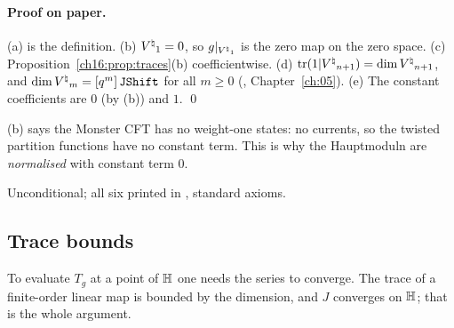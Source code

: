\paragraph{Proof on paper.}  (a) is the definition.  (b) ${V^{\natural}}_1=0$, so $g|_{{V^{\natural}}_1}$ is the zero map on the zero
space.  (c) Proposition~\ref{ch16:prop:traces}(b) coefficientwise.  (d) $\operatorname{tr}(1|{V^{\natural}}_{n+1})=\dim{V^{\natural}}_{n+1}$, and
$\dim{V^{\natural}}_m=[q^m]\,\mathtt{JShift}$ for all $m\ge0$ (,
Chapter~\ref{ch:05}).  (e) The constant coefficients are $0$ (by (b)) and $1$. \qed
\begin{physics}
(b) says the Monster CFT has no weight-one states: no currents, so the twisted partition functions have no constant
term.  This is why the Hauptmoduln are \emph{normalised} with constant term $0$.
\end{physics}
\begin{status}
Unconditional; all six printed in , standard axioms.
\end{status}

\subsection{Trace bounds}

To evaluate $T_g$ at a point of $\mathbb{H}$ one needs the series to converge.  The trace of a finite-order linear
map is bounded by the dimension, and $J$ converges on $\mathbb{H}$; that is the whole argument.

